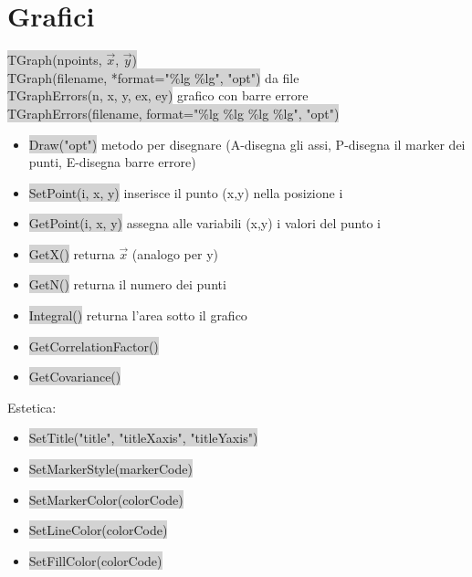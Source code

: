 \documentclass[a4paper]{article}
\begin{document}
\section{Grafici}
    \colorbox{LightGray}{TGraph(npoints, $\vec{x}$, $\vec{y}$)}\\
    \colorbox{LightGray}{TGraph(filename, *format="\%lg \%lg", "opt")} da file\\
    \colorbox{LightGray}{TGraphErrors(n, x, y, ex, ey)} grafico con barre errore\\
    \colorbox{LightGray}{TGraphErrors(filename, format="\%lg \%lg \%lg \%lg", "opt")}\\
    \begin{itemize}
        \item \colorbox{LightGray}{Draw("opt")} metodo per disegnare (A-disegna gli assi, P-disegna il marker dei punti, E-disegna barre errore)
        \item \colorbox{LightGray}{SetPoint(i, x, y)} inserisce il punto (x,y) nella posizione i
        \item \colorbox{LightGray}{GetPoint(i, x, y)} assegna alle variabili (x,y) i valori del punto i
        \item \colorbox{LightGray}{GetX()} returna $\vec{x}$ (analogo per y)
        \item \colorbox{LightGray}{GetN()} returna il numero dei punti
        \item \colorbox{LightGray}{Integral()} returna l'area sotto il grafico
        \item \colorbox{LightGray}{GetCorrelationFactor()}
        \item \colorbox{LightGray}{GetCovariance()}
    \end{itemize}
    Estetica:
    \begin{itemize}
        \item \colorbox{LightGray}{SetTitle("title", "titleXaxis", "titleYaxis")}
        \item \colorbox{LightGray}{SetMarkerStyle(markerCode)}
        \item \colorbox{LightGray}{SetMarkerColor(colorCode)}
        \item \colorbox{LightGray}{SetLineColor(colorCode)}
        \item \colorbox{LightGray}{SetFillColor(colorCode)}
    \end{itemize}
\end{document}
